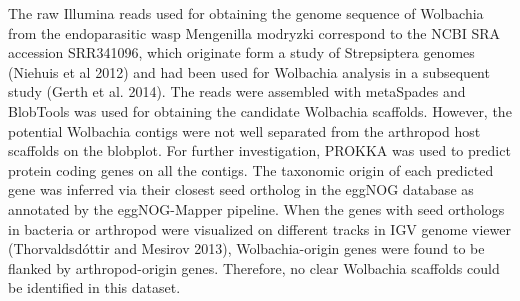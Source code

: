 \documentclass[10pt, a4paper, twocolumn]{article} %
\begin{document}
The raw Illumina reads used for obtaining the genome sequence of Wolbachia from the endoparasitic wasp Mengenilla modryzki correspond to the NCBI SRA accession SRR341096, which originate form a study of Strepsiptera genomes (Niehuis et al 2012) and had been used for Wolbachia analysis in a subsequent study (Gerth et al. 2014). The reads were assembled with metaSpades and BlobTools was used for obtaining the candidate Wolbachia scaffolds. However, the potential Wolbachia contigs were not well separated from the arthropod host scaffolds on the blobplot. For further investigation, PROKKA was used to predict protein coding genes on all the contigs. The taxonomic origin of each predicted gene was inferred via their closest seed ortholog in the eggNOG database as annotated by the eggNOG-Mapper pipeline. When the genes with seed orthologs in bacteria or arthropod were visualized on different tracks in IGV genome viewer (Thorvaldsdóttir and Mesirov 2013), Wolbachia-origin genes were found to be flanked by arthropod-origin genes. Therefore, no clear Wolbachia scaffolds could be identified in this dataset.
\end{document}
